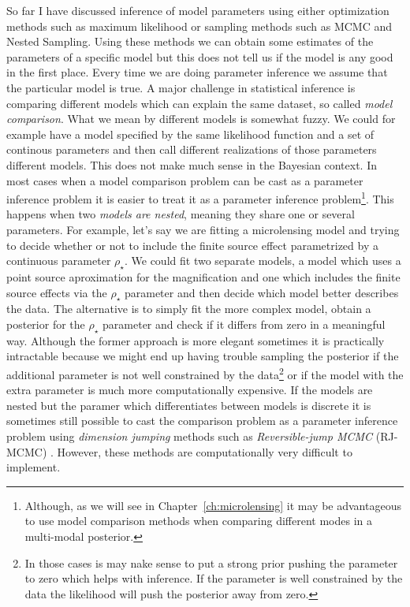 \documentclass[12pt,dvipsnames]{report}
\begin{document}
So far I have discussed inference of model parameters using either optimization 
methods such as maximum likelihood or sampling methods such as MCMC and Nested 
Sampling.
Using these methods we can obtain some estimates of the parameters of a specific  
model but this  does not tell us if the model is any good in the first place.
Every time we are doing parameter inference we assume that the particular model
is true.
A major challenge in statistical inference is comparing different 
models which can explain the same dataset, so called \textsl{model comparison}.
What we mean by different models is somewhat fuzzy. We could for example have 
a model specified by the same likelihood function and a set of continous 
parameters and then call different realizations of those parameters different 
models. This does not make much sense in the Bayesian context. In most cases
when a model comparison problem can be cast as a parameter inference problem it 
is easier to treat it as a parameter inference problem\footnote{Although, as we
will see in Chapter~\ref{ch:microlensing} it may be advantageous  to use model 
comparison methods when comparing different modes in a multi-modal posterior.}.
This happens when two \emph{models are nested}, meaning they share one or 
several parameters.
For example, let's say we are fitting a microlensing model and trying to decide 
whether  or not to include the finite source effect parametrized by a continuous 
parameter $\rho_\star$.
We could fit two separate models, a model which uses a point source 
aproximation for the magnification and one which includes the finite source 
effects via the $\rho_\star$ parameter and then decide which model better 
describes the data. The alternative is to simply fit the more complex model, 
obtain a posterior for the $\rho_\star$ parameter and check if it differs from 
zero in a meaningful way. Although the former approach is more elegant sometimes
it is practically intractable because we might end up having trouble sampling 
the posterior if the additional parameter is not well constrained by the data\footnote{In those
cases is may nake sense to put a strong prior pushing the parameter to zero which 
helps with inference. If the parameter is well constrained by the data the 
likelihood will push the posterior away from zero.} or if the model with the 
extra parameter is much more computationally expensive. 
If the models are nested but the paramer which differentiates between models is 
discrete it is sometimes still possible to cast the comparison problem as a parameter 
inference problem using \emph{dimension jumping} methods such as 
\textsl{Reversible-jump MCMC} (RJ-MCMC)
\citep[See][for an application of a method similar to RJ-MCMC to an 
astronomy problem]{2015MNRAS.448.3206B}.
However, these methods are computationally very difficult to implement.
\end{document}
